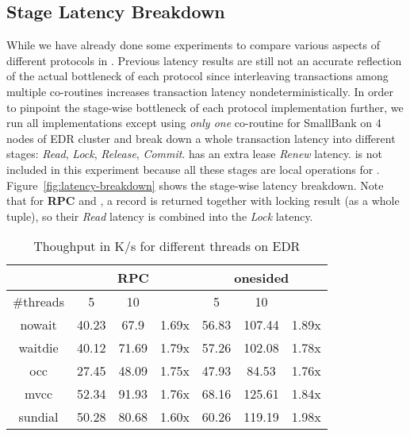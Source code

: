 


\subsection{Stage Latency Breakdown}

While we have already done some experiments to compare various aspects of different protocols in \projectname. Previous latency results are still not an accurate reflection of the actual bottleneck of each protocol since interleaving transactions among multiple co-routines increases transaction latency nondeterministically. In order to pinpoint the stage-wise bottleneck of each protocol implementation further, we run all implementations except \calvin using {\em only one} co-routine for SmallBank on 4 nodes of {EDR} cluster and break down a whole transaction latency into different stages: \textit{Read}, \textit{Lock}, \textit{Release}, \textit{Commit}. \sundial has an extra lease \textit{Renew} latency. \calvin is not included in this experiment because all these stages are local operations for \calvin. Figure~\ref{fig:latency-breakdown} shows the stage-wise latency breakdown. Note that for \textbf{RPC} \nowait and \waitdie, a record is returned together with locking result (as a  whole tuple), so their \textit{Read} latency is combined into the \textit{Lock} latency.

\begin{table}[h!]
\vspace{-2mm}
\caption{Thoughput in K/s for different threads on EDR}
\vspace{-2mm}
\centering
\begin{tabular}{|c|c|c|c|c|c|c|}
 \hline
  &
 \multicolumn{3}{|c|}{\textbf{RPC}} &
 \multicolumn{3}{|c|}{\textbf{onesided}} \\
 \hline
 \#threads & 5 & 10 & & 5 & 10 & \\
 \hline
 nowait & 40.23	& 67.9 & 1.69x &	56.83 & 107.44 & 1.89x \\
 \hline
 waitdie & 40.12 & 71.69 & 1.79x & 57.26 & 102.08 & 1.78x \\
 \hline
 occ & 27.45 & 48.09 & 1.75x & 47.93 & 84.53 & 1.76x \\
 \hline
 mvcc & 52.34 & 91.93 & 1.76x & 68.16 & 125.61 & 1.84x \\
 \hline
 sundial & 50.28 & 80.68 & 1.60x & 60.26 & 119.19 & 1.98x \\
 \hline
\end{tabular}
\label{tbl:two-threads}
\end{table}


